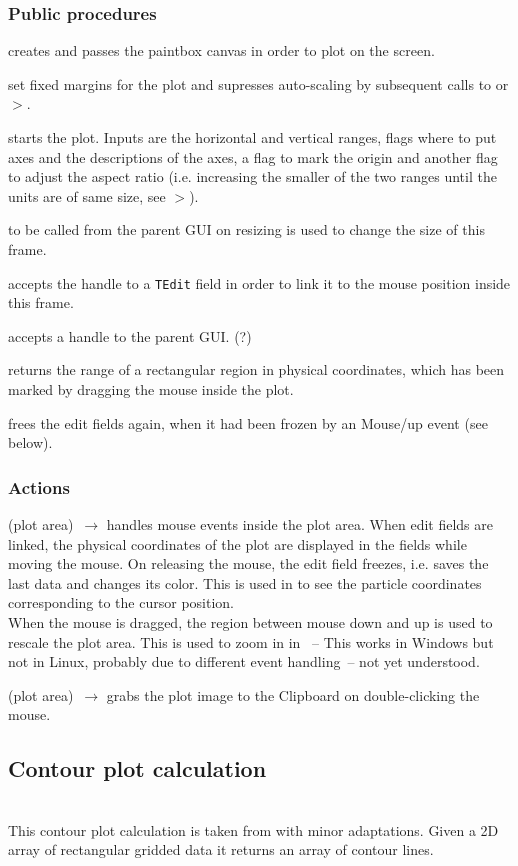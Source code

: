\documentclass[12pt]{article}
\newcommand\code[1]{{\tt #1}}
\newcommand{\ofldx}[1]{\colorbox{black!15}{(#1)}}
\newcommand\guifco[1]{{\color{violet}\code{#1}}}
\newcommand{\evcodxf}[2]{\ofldx{#1}~$\rightarrow$ \guifco{#2}}
\newcommand{\gfcod}[2]{\opaguif{#1}$>$\guifco{#2}}
\newcommand{\opagui}[1]{\colorbox{blue!20}{{\color{black}\code{#1}}}}
\newcommand{\ogui}[1]{\hyperref[#1]{\opagui{#1}}}
\newcommand{\opaguif}[1]{\colorbox{violet!30}{{\color{black}\code{#1}}}}
\newcommand{\opauni}[1]{\colorbox{orange!30}{{\color{black}\code{#1}}}}
\newcommand{\ounih}[2]{\subsection{\label{#2}#1}{\Huge\opauni{#2}}\\}
\newcommand{\desc}[1]{#1}
\newcommand{\act}[1]{\subsubsection*{Actions} #1}
\newcommand{\ppro}[1]{\subsubsection*{Public procedures} #1}
\newcommand{\todo}[1]{{\color{red} #1}}
\begin{document}
\ppro{

\guifco{assignScreen} creates \guifco{Vplot} and passes the paintbox canvas in order to plot on the screen.

\guifco{forceMargin*} set fixed margins for the plot and supresses auto-scaling by subsequent calls to \guifco{Init} or \gfcod{vgraph}{Axis}.

\guifco{Init} starts the plot. Inputs are the horizontal and vertical ranges, flags where to put axes and the descriptions of the axes, a flag to mark the origin and another flag to adjust the aspect ratio (i.e. increasing the smaller of the two ranges until the units are of same size, see \gfcod{vgraph}{AdjustAspectRatio}).

\guifco{SetSize} to be called from the parent GUI on resizing is used to change the size of this frame.

\guifco{PassEditHandle*} accepts the handle to a \code{TEdit} field in order to link it to the mouse position inside this frame.

\guifco{PassFormHandle} accepts a handle to the parent GUI. \todo{(?)}

\guifco{GetRange} returns the range of a rectangular region in physical coordinates, which has been marked by dragging the mouse inside the plot.

\guifco{UnfreezeEdit} frees the edit fields again, when it had been frozen by an Mouse/up event (see below).
}


\act{
\evcodxf{plot area}{pMouseDown,pMouseMove,pMouseUp} handles mouse events inside the plot area.
When edit fields are linked, the physical coordinates of the plot are displayed in the fields while moving the mouse. On releasing the mouse, the edit field freezes, i.e. saves the last data and changes its color.
This is used in \ogui{opatrackps} %
to see the particle coordinates corresponding to the cursor position. \\
When the mouse is dragged, the region between mouse down and up is used to rescale the plot area. This is used to zoom in in \ogui{opageometry}~-- \todo{This works in Windows but not in Linux, probably due to different event handling~-- not yet understood.}

\evcodxf{plot area}{pDblClick} grabs the plot image to the Clipboard on double-clicking the mouse.
}



\ounih{Contour plot calculation}{../com/conrect}

\desc{This contour plot calculation is taken from \cite{CONRECT} with minor adaptations. Given a 2D array of rectangular gridded data it returns an array of contour lines.}
\end{document}
